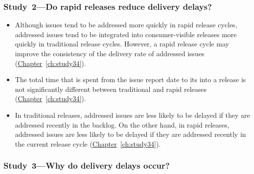 \subsubsection*{Study~2---Do rapid releases reduce delivery delays?}

\begin{itemize}

	\item Although issues tend to be addressed more quickly in rapid
		release cycles, addressed issues tend to be integrated into
		consumer-visible releases more quickly in traditional
		release cycles. However, a rapid release cycle may improve the
		consistency of the delivery rate of addressed issues
		(\hyperref[ch:study34]{Chapter}~\ref{ch:study34}).

	\item The total time that is spent from the issue report date to its
		\DIFdelbegin {}\DIFdelend \DIFaddbegin {}\DIFaddend into a release is not significantly different
		between traditional and rapid releases
		(\hyperref[ch:study34]{Chapter}~\ref{ch:study34}).

	\item In traditional releases, addressed issues are less likely to be
		delayed if they are addressed recently in the backlog. On the
		other hand, in rapid releases, addressed issues are less likely
		to be delayed if they are addressed recently in the current
		release cycle (\hyperref[ch:study34]{Chapter}~\ref{ch:study34}). 
\end{itemize}

\subsubsection*{Study~3---Why do delivery delays occur?}

